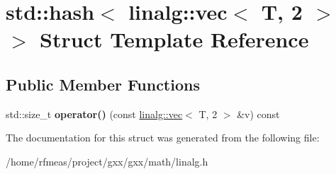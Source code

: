 \hypertarget{structstd_1_1hash_3_01linalg_1_1vec_3_01T_00_012_01_4_01_4}{}\section{std\+:\+:hash$<$ linalg\+:\+:vec$<$ T, 2 $>$ $>$ Struct Template Reference}
\label{structstd_1_1hash_3_01linalg_1_1vec_3_01T_00_012_01_4_01_4}
\subsection*{Public Member Functions}
\begin{DoxyCompactItemize}
\item 
std\+::size\+\_\+t {\bfseries operator()} (const \hyperlink{structlinalg_1_1vec}{linalg\+::vec}$<$ T, 2 $>$ \&v) const \hypertarget{structstd_1_1hash_3_01linalg_1_1vec_3_01T_00_012_01_4_01_4_a4b100ee318642fae605c8fc809fe8f5a}{}\label{structstd_1_1hash_3_01linalg_1_1vec_3_01T_00_012_01_4_01_4_a4b100ee318642fae605c8fc809fe8f5a}

\end{DoxyCompactItemize}


The documentation for this struct was generated from the following file\+:\begin{DoxyCompactItemize}
\item 
/home/rfmeas/project/gxx/gxx/math/linalg.\+h\end{DoxyCompactItemize}
